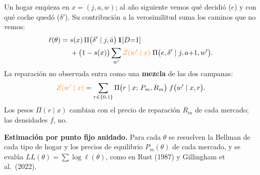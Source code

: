 \documentclass[border=0pt]{standalone}
\newcommand{\no}[1]{{\color{orange}#1}}
\begin{document}
\begin{minipage}{26.783cm}\fontsize{27}{33.5}\selectfont\raggedright 
Un hogar empieza en $x=(j,a,w)$; al año siguiente vemos qué decidió ($e$) y con qué
coche quedó ($\delta'$). Su contribución a la verosimilitud suma los caminos que no
vemos:
\[ \begin{aligned} \ell(\theta)=\;&s(x)\,\Pi\big(\delta'\mid j,\bar a\big)\,\mathbf{1}[D{=}1]\\
   &+\big(1-s(x)\big)\sum_{w'}\no{Z(w'\mid x)}\;\Pi\big(e,\delta'\mid j,a{+}1,w'\big). \end{aligned} \]
La reparación no observada entra como una \textbf{mezcla} de las dos campanas:
\[ \no{Z(w'\mid x)}=\sum_{r\in\{0,1\}}\Pi\big(r\mid x;\,P_m,R_m\big)\;
   f\big(w'\mid x,r\big). \]
Los pesos $\Pi(r\mid x)$ cambian con el precio de reparación $R_m$ de cada mercado;
las densidades $f$, no.

\textbf{Estimación por punto fijo anidado.} Para cada $\theta$ se resuelven la
Bellman de cada tipo de hogar y los precios de equilibrio $P_m(\theta)$ de cada
mercado, y se evalúa $LL(\theta)=\sum\log\ell(\theta)$, como en Rust (1987) y
Gillingham et al.\ (2022).
\end{minipage}
\end{document}
